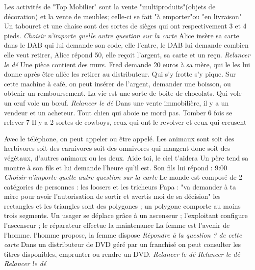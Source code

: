 \umlpiccard
{Les activités de "Top Mobilier" sont la vente "multiproduits"(objets de décoration) et la vente de meubles; celle-ci se fait "à emporter"ou "en livraison"
}
{Un tabouret et une chaise sont des sortes de sièges qui ont respectivement 3 et 4 pieds.
}
{\emph{Choisir n'importe quelle autre question sur la carte}
}
{Alice insère sa carte dans le DAB qui lui demande son code, elle l'entre, le DAB lui demande combien elle veut retirer, Alice répond 50, elle reçoit l'argent, sa carte et un reçu.
}
\umlpiccard
{\emph{Relancer le dé}
}
{Une pièce contient des murs.
}
{Fred demande 20 euros à sa mère, qui le les lui donne après être allée les retirer au distributeur.
}
{\challenge Qui s'y frotte s'y pique.
}
\umlpiccard
{Sur cette machine à café, on peut insérer de l'argent, demander une boisson, ou obtenir un remboursement.
}
{La vie est une sorte de boite de chocolats.
}
{Qui vole un œuf vole un bœuf. 
}
{\emph{Relancer le dé}
}
\umlpiccard
{Dans une vente immobilière, il y a un vendeur et un acheteur.
}
{\challenge Tout chien qui aboie ne mord pas.
}
{Tomber 6 fois se relever 7
}
{Il y a 2 sortes de cowboys, ceux qui ont le revolver et ceux qui creusent
}

\newrow
\umlpiccard
{\challenge Avec le téléphone, on peut appeler ou être appelé.
}
{\challenge Les animaux sont soit des herbivores soit des carnivores soit des omnivores qui mangent donc soit des végétaux, d'autres animaux ou les deux.
}
{Aide toi, le ciel t'aidera
}
{Un père tend sa montre à son fils et lui demande l'heure qu'il est. Son fils lui répond : 9:00
}
\umlpiccard
{\emph{Choisir n'importe quelle autre question sur la carte}
}
{Le monde est composé de 2 catégories de personnes : les loosers et les tricheurs
}
{\challenge Papa : "va demander à ta mère pour avoir l'autorisation de sortir et avertis moi de sa décision"
}
{les rectangles et les triangles sont des polygones ; un polygone comporte au moins trois segments.
}
\umlpiccard
{Un usager se déplace grâce à un ascenseur ; l'exploitant configure l'ascenseur ; le réparateur effectue la maintenance
}
{\challenge La femme est l'avenir de l'homme.
}
{l'homme propose, la femme dispose
}
{\emph{Répondre à la question ? de cette carte} 
}
\umlpiccard
{Dans un distributeur de DVD géré par un franchisé on peut consulter les titres disponibles, emprunter ou rendre un DVD.
}
{\challenge \emph{Relancer le dé}
}
{\emph{Relancer le dé}
}
{\challenge \emph{Relancer le dé}
}

